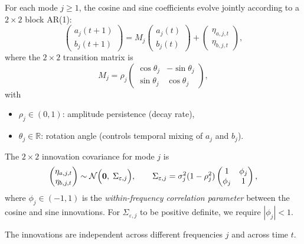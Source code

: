 \documentclass[answers,12pt,addpoints]{exam}
\begin{document}
For each mode $j \ge 1$, the cosine and sine coefficients evolve jointly according to a $2 \times 2$ block AR(1):
\begin{equation}
  \begin{pmatrix} a_j(t+1) \\ b_j(t+1) \end{pmatrix}
  =
  M_j
  \begin{pmatrix} a_j(t) \\ b_j(t) \end{pmatrix}
  +
  \begin{pmatrix} \eta_{a,j,t} \\ \eta_{b,j,t} \end{pmatrix},
  \label{eq:ar1-block}
\end{equation}
where the $2 \times 2$ transition matrix is
\begin{equation}
  M_j
  =
  \rho_j
  \begin{pmatrix}
    \cos\theta_j & -\sin\theta_j \\
    \sin\theta_j & \cos\theta_j
  \end{pmatrix},
  \label{eq:Mj-rotation}
\end{equation}
with
\begin{itemize}
  \item $\rho_j \in (0,1)$: amplitude persistence (decay rate),
  \item $\theta_j \in \mathbb{R}$: rotation angle (controls temporal mixing of $a_j$ and $b_j$).
\end{itemize}

The $2 \times 2$ innovation covariance for mode $j$ is
\begin{equation}
  \begin{pmatrix} \eta_{a,j,t} \\ \eta_{b,j,t} \end{pmatrix}
  \sim
  \mathcal{N}\Bigl(\mathbf{0},\; \Sigma_{\varepsilon,j}\Bigr),
  \qquad
  \Sigma_{\varepsilon,j}
  =
  \sigma_j^2(1 - \rho_j^2)
  \begin{pmatrix} 1 & \phi_j \\ \phi_j & 1 \end{pmatrix},
  \label{eq:innovation-cov}
\end{equation}
where $\phi_j \in (-1,1)$ is the \emph{within-frequency correlation parameter} between the cosine and sine innovations. For $\Sigma_{\varepsilon,j}$ to be positive definite, we require $|\phi_j| < 1$.

The innovations are independent across different frequencies $j$ and across time $t$.
\end{document}
